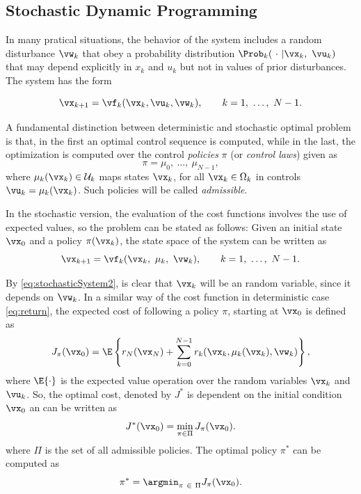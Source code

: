 \subsection{Stochastic Dynamic Programming}
\label{sec:SDP}

In many pratical situations, the behavior of the system includes a random disturbance $\vw_k$ that obey a probability distribution $\Prob_k(\ \cdot \ | \vx_k,\ \vu_k)$ that may depend explicitly in $x_k$ and $ u_k$ but not in values of prior disturbances. The system has the form

\begin{equation}
   \vx_{k+1} = \vf_k(\vx_k,\vu_k,\vw_k), \qquad k=1,\ \dots,\ N-1
\label{eq:stochasticSystem}.
\end{equation}

A fundamental distinction between deterministic and stochastic optimal problem is that, in the first an optimal control sequence is computed, while in the last, the optimization is computed over the control \textit{policies} $\pi$ (or \textit{control laws}) given as
\begin{equation}
   \pi = {\mu_0,\ \dots,\ \mu_{N-1}} ,
\end{equation}
where $\mu_k(\vx_k) \in \mathcal{U}_k$ maps states $\vx_k$, for all $\vx_k \in \Omega_k$ in controls $\vu_k = \mu_k(\vx_k)$. Such policies will be called \textit{admissible}.

In the stochastic version, the evaluation of the cost functions involves the use of expected values, so the problem can be stated as follows: Given an initial state $\vx_0$ and a policy $\pi(\vx_k)$, the state space of the system can be written as
\begin{equation}
   \vx_{k+1} = \vf_k(\vx_k,\ \mu_k,\ \vw_k), \qquad k= 1,\ \dots,\ N-1
\label{eq:stochasticSystem2}.
\end{equation}

By \eqref{eq:stochasticSystem2}, is clear that $\vx_k$ will be an random variable, since it depends on $\vw_k$. In a similar way of the cost function in deterministic case \eqref{eq:return}, the expected cost of following a policy $\pi$, starting at $\vx_0$ is defined as
\begin{equation}
  J_\pi(\vx_0) = \E\left\{ r_N(\vx_N) + \sum_{k=0}^{N-1} r_k(\vx_k,\mu_k(\vx_k),\vw_k) \right\},
\label{eq:Jpi_1}
\end{equation}
where $\E\{\cdot\}$ is the expected value operation over the random variables $\vx_k$ and $\vu_k$. So, the optimal cost, denoted by $J^*$ is dependent on the initial condition $\vx_0$ an can be written as
\begin{equation}
   J^*(\vx_0) = \min_{\pi \in \Pi}J_\pi(\vx_0)
\label{eq:Jpi_2}.
\end{equation}
where $\Pi$ is the set of all admissible policies.
The optimal policy $\pi^*$ can be computed as
\begin{equation}
   \pi^* = \argmin_{\pi\ \in\ \Pi} J_\pi(\vx_0) .
\end{equation}

